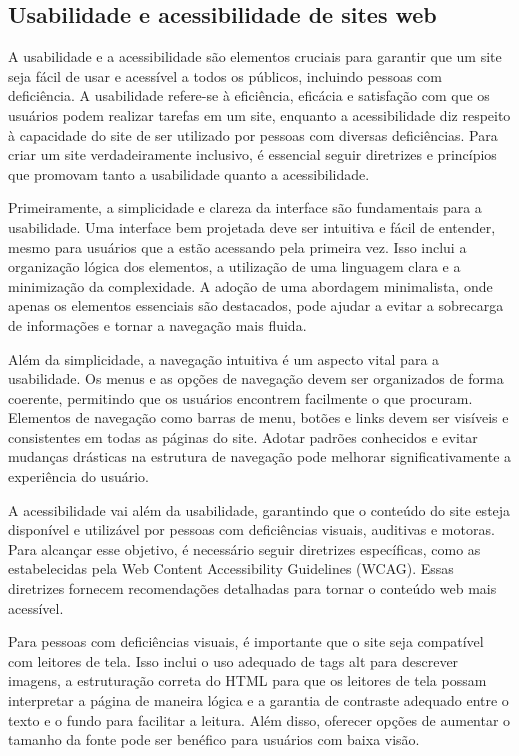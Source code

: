 \subsection{Usabilidade e acessibilidade de sites web}

A usabilidade e a acessibilidade são elementos cruciais para garantir que um site seja fácil de usar e acessível a todos os públicos, incluindo pessoas com deficiência. A usabilidade refere-se à eficiência, eficácia e satisfação com que os usuários podem realizar tarefas em um site, enquanto a acessibilidade diz respeito à capacidade do site de ser utilizado por pessoas com diversas deficiências. Para criar um site verdadeiramente inclusivo, é essencial seguir diretrizes e princípios que promovam tanto a usabilidade quanto a acessibilidade.

Primeiramente, a simplicidade e clareza da interface são fundamentais para a usabilidade. Uma interface bem projetada deve ser intuitiva e fácil de entender, mesmo para usuários que a estão acessando pela primeira vez. Isso inclui a organização lógica dos elementos, a utilização de uma linguagem clara e a minimização da complexidade. A adoção de uma abordagem minimalista, onde apenas os elementos essenciais são destacados, pode ajudar a evitar a sobrecarga de informações e tornar a navegação mais fluida.

Além da simplicidade, a navegação intuitiva é um aspecto vital para a usabilidade. Os menus e as opções de navegação devem ser organizados de forma coerente, permitindo que os usuários encontrem facilmente o que procuram. Elementos de navegação como barras de menu, botões e links devem ser visíveis e consistentes em todas as páginas do site. Adotar padrões conhecidos e evitar mudanças drásticas na estrutura de navegação pode melhorar significativamente a experiência do usuário.

A acessibilidade vai além da usabilidade, garantindo que o conteúdo do site esteja disponível e utilizável por pessoas com deficiências visuais, auditivas e motoras. Para alcançar esse objetivo, é necessário seguir diretrizes específicas, como as estabelecidas pela Web Content Accessibility Guidelines (WCAG). Essas diretrizes fornecem recomendações detalhadas para tornar o conteúdo web mais acessível.

Para pessoas com deficiências visuais, é importante que o site seja compatível com leitores de tela. Isso inclui o uso adequado de tags alt para descrever imagens, a estruturação correta do HTML para que os leitores de tela possam interpretar a página de maneira lógica e a garantia de contraste adequado entre o texto e o fundo para facilitar a leitura. Além disso, oferecer opções de aumentar o tamanho da fonte pode ser benéfico para usuários com baixa visão.

